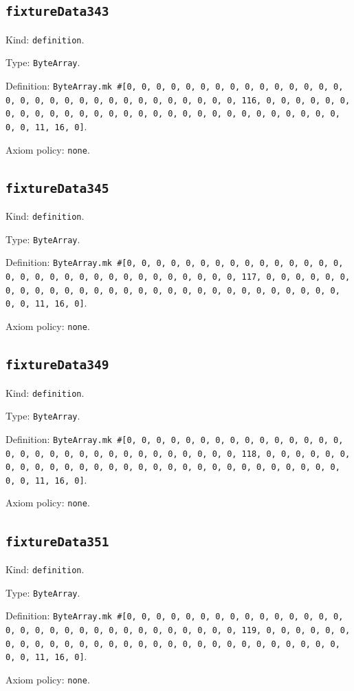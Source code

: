 \documentclass[11pt]{article}
\begin{document}
\subsection*{\texttt{fixtureData343}}
\noindent Kind: \texttt{definition}.\par
\noindent Type: \texttt{ByteArray}.\par
\noindent Definition: \texttt{ByteArray.mk \#[0, 0, 0, 0, 0, 0, 0, 0, 0, 0, 0, 0, 0, 0, 0, 0, 0, 0, 0, 0, 0, 0, 0, 0, 0, 0, 0, 0, 0, 0, 0, 116, 0, 0, 0, 0, 0, 0, 0, 0, 0, 0, 0, 0, 0, 0, 0, 0, 0, 0, 0, 0, 0, 0, 0, 0, 0, 0, 0, 0, 0, 0, 0, 11, 16, 0]}.\par
\noindent Axiom policy: \texttt{none}.\par
\subsection*{\texttt{fixtureData345}}
\noindent Kind: \texttt{definition}.\par
\noindent Type: \texttt{ByteArray}.\par
\noindent Definition: \texttt{ByteArray.mk \#[0, 0, 0, 0, 0, 0, 0, 0, 0, 0, 0, 0, 0, 0, 0, 0, 0, 0, 0, 0, 0, 0, 0, 0, 0, 0, 0, 0, 0, 0, 0, 117, 0, 0, 0, 0, 0, 0, 0, 0, 0, 0, 0, 0, 0, 0, 0, 0, 0, 0, 0, 0, 0, 0, 0, 0, 0, 0, 0, 0, 0, 0, 0, 11, 16, 0]}.\par
\noindent Axiom policy: \texttt{none}.\par
\subsection*{\texttt{fixtureData349}}
\noindent Kind: \texttt{definition}.\par
\noindent Type: \texttt{ByteArray}.\par
\noindent Definition: \texttt{ByteArray.mk \#[0, 0, 0, 0, 0, 0, 0, 0, 0, 0, 0, 0, 0, 0, 0, 0, 0, 0, 0, 0, 0, 0, 0, 0, 0, 0, 0, 0, 0, 0, 0, 118, 0, 0, 0, 0, 0, 0, 0, 0, 0, 0, 0, 0, 0, 0, 0, 0, 0, 0, 0, 0, 0, 0, 0, 0, 0, 0, 0, 0, 0, 0, 0, 11, 16, 0]}.\par
\noindent Axiom policy: \texttt{none}.\par
\subsection*{\texttt{fixtureData351}}
\noindent Kind: \texttt{definition}.\par
\noindent Type: \texttt{ByteArray}.\par
\noindent Definition: \texttt{ByteArray.mk \#[0, 0, 0, 0, 0, 0, 0, 0, 0, 0, 0, 0, 0, 0, 0, 0, 0, 0, 0, 0, 0, 0, 0, 0, 0, 0, 0, 0, 0, 0, 0, 119, 0, 0, 0, 0, 0, 0, 0, 0, 0, 0, 0, 0, 0, 0, 0, 0, 0, 0, 0, 0, 0, 0, 0, 0, 0, 0, 0, 0, 0, 0, 0, 11, 16, 0]}.\par
\noindent Axiom policy: \texttt{none}.\par
\end{document}
